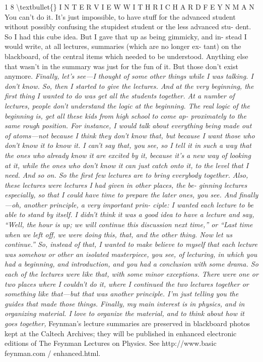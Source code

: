 \documentclass[10pt,oneside]{article}
\begin{document}
1 8 \textbackslash{}textbullet\{\} I N T E R V I E W  W I T H  R I C H A R D  F E Y N M A N You can’t do it. It’s just impossible, to have stuff for the advanced student without possibly confusing the stupidest student or the less advanced stu- dent. So I had this cube idea. But I gave that up as being gimmicky, and in- stead I would write, at all lectures, summaries (which are no longer ex- tant) on the blackboard, of the central items which needed to be understood. Anything else that wasn’t in the summary was just for the fun of it. But those don’t exist anymore.\emph{ Finally, let’s see---I thought of some other things while I was talking. I don’t know. So, then I started to give the lectures. And at the very beginning, the first thing I wanted to do was get all the students together. At a number of lectures, people don’t understand the logic at the beginning. The real logic of the beginning is, get all these kids from high school to come ap- proximately to the same rough position. For instance, I would talk about everything being made out of atoms---not because I think they don’t know that, but because I want those who don’t know it to know it. I can’t say that, you see, so I tell it in such a way that the ones who already know it are excited by it, because it’s a new way of looking at it, while the ones who don’t know it can just catch onto it, to the level that I need. And so on. So the first few lectures are to bring everybody together. Also, these lectures were lectures I had given in other places, the be- ginning lectures especially, so that I could have time to prepare the later ones, you see. And finally---oh, another principle, a very important prin- ciple: I wanted each lecture to be able to stand by itself. I didn’t think it was a good idea to have a lecture and say, “Well, the hour is up; we will continue this discussion next time,” or “Last time when we left off, we were doing this, that, and the other thing. Now let us continue.” So, instead of that, I wanted to make believe to myself that each lecture was somehow or other an isolated masterpiece, you see, of lecturing, in which you had a beginning, and introduction, and you had a conclusion with some drama. So each of the lectures were like that, with some minor exceptions. There were one or two places where I couldn’t do it, where I continued the two lectures together or something like that---but that was another principle. I’m just telling you the guides that made those things. Finally, my main interest is in physics, and in organizing material. I love to organize the material, and to think about how it goes together, } Feynman’s lecture summaries are preserved in blackboard photos kept at the Caltech Archives; they will be published in enhanced electronic editions of The Feynman Lectures on Physics. See http://www.basic feynman.com / enhanced.html.\par
\end{document}
